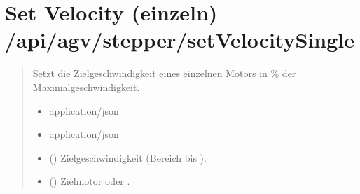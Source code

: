 \documentclass[letterpaper,10pt,english]{sphinxmanual}
\begin{document}
\section{Set Velocity (einzeln) \textendash{} /api/agv/stepper/setVelocitySingle}
\label{\detokenize{agv_rest_api_stepper:set-velocity-einzeln-api-agv-stepper-setvelocitysingle}}\label{\detokenize{agv_rest_api_stepper:post-api-agv-stepper-setvelocitysingle}}

\begin{fulllineitems}
\label{\detokenize{agv_rest_api_stepper:post--api-agv-stepper-setVelocitySingle}}
\pysigstartsignatures
\pysigline
{}
\pysigstopsignatures\begin{quote}\begin{description}
\sphinxAtStartPar
Setzt die Zielgeschwindigkeit eines einzelnen Motors in \% der Maximalgeschwindigkeit.

\begin{itemize}
\item {} 
\sphinxAtStartPar
{} \textendash{} application/json

\end{itemize}

\begin{itemize}
\item {} 
\sphinxAtStartPar
{} \textendash{} application/json

\end{itemize}

\begin{itemize}
\item {} 
\sphinxAtStartPar
{} () \textendash{} Zielgeschwindigkeit (Bereich  bis ).

\item {} 
\sphinxAtStartPar
{} () \textendash{} Zielmotor  oder .


\end{itemize}
\end{description}
\end{quote}
\end{fulllineitems}
\end{document}
